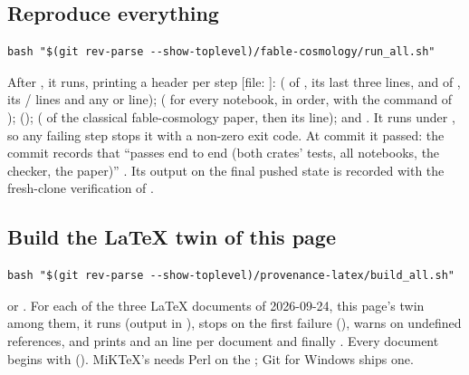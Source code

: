 \subsection{Reproduce everything}
\label{sec:11.10}

\begin{Verbatim}
bash "$(git rev-parse --show-toplevel)/fable-cosmology/run_all.sh"
\end{Verbatim}
After , it runs, printing a header per step [file: ]:
 ( of , its last three lines, and of
, its / lines and any  or
 line);  ( for every notebook, in
order, with the  command of ); 
();  ( of the classical fable-cosmology paper, then its
 line); and . It runs under , so any failing step
stops it with a non-zero exit code. At commit  it passed: the commit records that
 ``passes end to end (both crates' tests, all notebooks, the checker,
the paper)'' . Its output on the final pushed state is recorded with the fresh-clone
verification of .

\subsection{Build the LaTeX twin of this page}
\label{sec:11.11}

\begin{Verbatim}
bash "$(git rev-parse --show-toplevel)/provenance-latex/build_all.sh"
\end{Verbatim}
or . For each of the three LaTeX
documents of 2026-09-24, this page's twin
 among them, it runs
 (output in
), stops on the first failure
(), warns on undefined references, and
prints  and an  line per document and finally .
Every document begins with \verb|| (). MiKTeX's
 needs Perl on the ; Git for Windows ships one.

